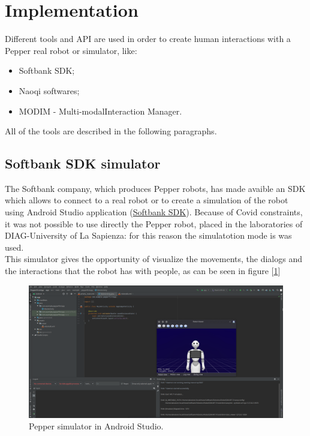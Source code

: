 \documentclass[12pt, letterpaper, twoside]{article}
\begin{document}
\newpage
\section{Implementation}
Different tools and API are used in order to create human interactions with a Pepper real robot or simulator, like:

\begin{itemize}
	\item Softbank SDK;
	\item Naoqi softwares;
	\item MODIM - Multi-modalInteraction Manager.
\end{itemize}

All of the tools are described in the following paragraphs.\\

\subsection{Softbank SDK simulator}
The Softbank company, which produces Pepper robots, has made avaible an SDK which allows to connect to a real robot or to create a simulation of the robot using Android Studio application (\href{https://qisdk.softbankrobotics.com/sdk/doc/pepper-sdk/index.html}{Softbank SDK}). Because of Covid constraints, it was not possible to use directly the Pepper robot, placed in the laboratories of DIAG-University of La Sapienza: for this reason the simulatotion mode is was used.\\

This simulator gives the opportunity of visualize the movements, the dialogs and the interactions that the robot has with people, as can be seen in figure [\ref{fig:android_sdk}]

\begin{figure}[htbp]
	\centerline{\includegraphics[scale=.3]{img/pepperSDK.png}}
	\caption{Pepper simulator in Android Studio.}
	\label{fig:android_sdk}
\end{figure}
\end{document}
